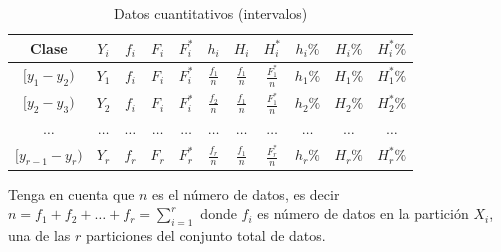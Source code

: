 \documentclass[10pt,]{krantz}
\theoremstyle{definition}
\theoremstyle{definition}
\theoremstyle{definition}
\theoremstyle{definition}
\theoremstyle{remark}
\begin{document}
\begin{longtable}[t]{ccccccccccc}
\caption{\label{tab:cuantitativaw}Datos cuantitativos (intervalos)}\\
\toprule
Clase & $Y_i$ & $f_i$ & $F_i$ & $F_i^*$ & $h_i$ & $H_i$ & $H_i^*$ & $h_i\%$ & $H_i\%$ & $H_i^*\%$\\
\midrule
$[y_1-y_2)$ & $Y_1$ & $f_i$ & $F_i$ & $F_i^*$ & $\frac{f_1}{n}$ & $\frac{f_1}{n}$ & $\frac{F_1^*}{n}$ & $h_1\%$ & $H_1\%$ & $H_1^*\%$\\
$[y_2-y_3)$ & $Y_2$ & $f_i$ & $F_i$ & $F_i^*$ & $\frac{f_2}{n}$ & $\frac{f_1}{n}$ & $\frac{F_1^*}{n}$ & $h_2\%$ & $H_2\%$ & $H_2^*\%$\\
$\ldots$ & $\ldots$ & $\ldots$ & $\ldots$ & $\ldots$ & $\ldots$ & $\ldots$ & $\ldots$ & $\ldots$ & $\ldots$ & $\ldots$\\
$[y_{r-1}-y_r)$ & $Y_r$ & $f_r$ & $F_r$ & $F_r^*$ & $\frac{f_r}{n}$ & $\frac{f_1}{n}$ & $\frac{F_r^*}{n}$ & $h_r\%$ & $H_r\%$ & $H_r^*\%$\\
\bottomrule
\end{longtable}

Tenga en cuenta que \(n\) es el número de datos, es decir \(n=f_1+f_2+\ldots+f_r=\sum_{i=1}^r\) donde \(f_i\) es número de datos en la partición \(X_i\), una de las \(r\) particiones del conjunto total de datos.
\end{document}
